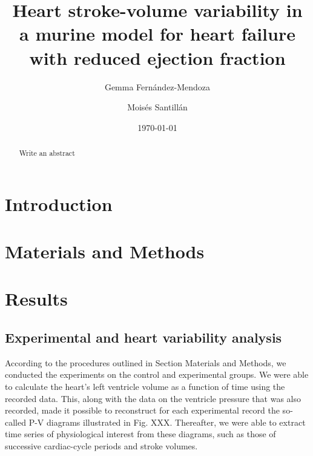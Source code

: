 \documentclass[%
preprint,
 amsmath,amssymb,
 aps,
]{revtex4-2}
\begin{document}
\preprint{}

\title{Heart stroke-volume variability in a murine model for heart failure with reduced ejection fraction}%

\author{Gemma Fernández-Mendoza}
%

\author{Moisés Santillán}
%

\date{\today}%

\begin{abstract}
Write an abstract
\end{abstract}

\maketitle


\section{\label{sec:intro}Introduction}

\section{Materials and Methods}

\section{Results}

\subsection{Experimental and heart variability analysis}

According to the procedures outlined in Section Materials and Methods, we conducted the experiments on the control and experimental groups. We were able to calculate the heart's left ventricle volume as a function of time using the recorded data. This, along with the data on the ventricle pressure that was also recorded, made it possible to reconstruct for each experimental record the so-called P-V diagrams illustrated in Fig. XXX. Thereafter, we were able to extract time series of physiological interest from these diagrams, such as those of successive cardiac-cycle periods and stroke volumes.
\end{document}
